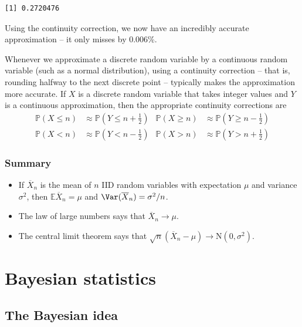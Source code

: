 \documentclass[
  letterpaper,
  DIV=11,
  numbers=noendperiod]{scrreprt}
\providecommand{\tightlist}{%
  \setlength{\itemsep}{0pt}\setlength{\parskip}{0pt}}\usepackage{longtable,booktabs,array}
\theoremstyle{remark}
\begin{document}
\begin{verbatim}
[1] 0.2720476
\end{verbatim}

Using the continuity correction, we now have an incredibly accurate
approximation -- it only misses by 0.006\%.

Whenever we approximate a discrete random variable by a continuous
random variable (such as a normal distribution), using a continuity
correction -- that is, rounding halfway to the next discrete point --
typically makes the approximation more accurate. If \(X\) is a discrete
random variable that takes integer values and \(Y\) is a continuous
approximation, then the appropriate continuity corrections are
\begin{align*}
\mathbb P(X \leq n) &\approx \mathbb P(Y \leq n + \tfrac12) & \mathbb P(X \geq n) &\approx \mathbb P(Y \geq n - \tfrac12) \\
\mathbb P(X < n) &\approx \mathbb P(Y < n - \tfrac12) & \mathbb P(X > n) &\approx \mathbb P(Y > n + \tfrac12) 
\end{align*}

\hypertarget{summary-09}{%
\section*{Summary}\label{summary-09}}


\begin{itemize}
\tightlist
\item
  If \(\overline X_n\) is the mean of \(n\) IID random variables with
  expectation \(\mu\) and variance \(\sigma^2\), then
  \(\mathbb E\overline X_n = \mu\) and
  \(\Var(\overline X_n) = \sigma^2/n\).
\item
  The law of large numbers says that \(\overline X_n \to \mu\).
\item
  The central limit theorem says that
  \(\sqrt{n}(\overline X_n - \mu) \to \text{N}(0, \sigma^2)\).
\end{itemize}

\part{Bayesian statistics}

\hypertarget{L19-bayes-idea}{%
\chapter{The Bayesian idea}\label{L19-bayes-idea}}
\end{document}
